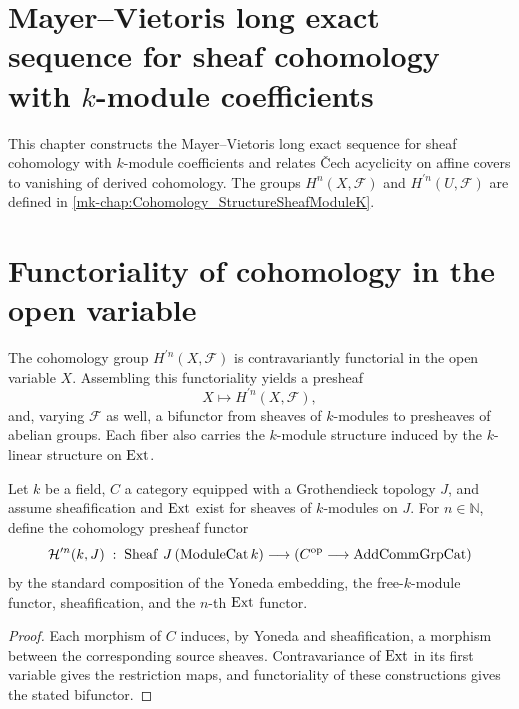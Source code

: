 \section{Mayer--Vietoris long exact sequence for sheaf cohomology with \(k\)-module coefficients}
\label{mk-chap:Cohomology_MayerVietoris}

This chapter constructs the Mayer--Vietoris long exact sequence for sheaf cohomology with \(k\)-module coefficients and relates \v{C}ech acyclicity on affine covers to vanishing of derived cohomology. The groups \(H^n(X,\mathcal F)\) and \(H^{\prime n}(U,\mathcal F)\) are defined in \ref{mk-chap:Cohomology_StructureSheafModuleK}.

\section{Functoriality of cohomology in the open variable}
\label{mk-sec:hmodule_prime_cohomologyPresheaf}

The cohomology group \(H^{\prime n}(X,\mathcal F)\) is contravariantly functorial in the open variable \(X\). Assembling this functoriality yields a presheaf
\[
  X \longmapsto H^{\prime n}(X, \mathcal F),
\]
and, varying \(\mathcal F\) as well, a bifunctor from sheaves of \(k\)-modules to presheaves of abelian groups. Each fiber also carries the \(k\)-module structure induced by the \(k\)-linear structure on \(\operatorname{Ext}\).

\begin{definition}\label{mk-def:Scheme_HModule_prime_cohomologyPresheafFunctor}
  \leanok


  Let \(k\) be a field, \(C\) a category equipped with a Grothendieck topology \(J\), and assume sheafification and \(\operatorname{Ext}\) exist for sheaves of \(k\)-modules on \(J\). For \(n \in \mathbb N\), define the cohomology presheaf functor
  \[
    \mathcal H^{\prime n}(k, J) \;:\; \operatorname{Sheaf}\,J\,(\mathrm{ModuleCat}\,k) \longrightarrow (C^{\mathrm{op}} \longrightarrow \mathrm{AddCommGrpCat})
  \]
  by the standard composition of the Yoneda embedding, the free-\(k\)-module functor, sheafification, and the \(n\)-th \(\operatorname{Ext}\) functor.
\end{definition}

\begin{proof}
  \leanok

  Each morphism of \(C\) induces, by Yoneda and sheafification, a morphism between the corresponding source sheaves. Contravariance of \(\operatorname{Ext}\) in its first variable gives the restriction maps, and functoriality of these constructions gives the stated bifunctor.
\end{proof}

